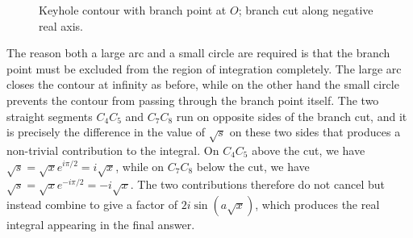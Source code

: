 \begin{figure}
\caption{Keyhole contour with branch point at $O$; branch cut along negative real axis.}
\label{fig:branch}
\end{figure}


The reason both a large arc and a small circle are required is that the branch point must be excluded from the region of integration completely. The large arc closes the contour at infinity as before, while on the other hand the small circle prevents the contour from passing through the branch point itself. The two straight segments $C_4C_5$ and $C_7C_8$ run on opposite sides of the branch cut, and it is precisely the difference in the value of $\sqrt{s}$ on these two sides that produces a non-trivial contribution to the integral. On $C_4C_5$ above the cut, we have $\sqrt{s} = \sqrt{x}e^{i\pi/2} = i\sqrt{x}$, while on $C_7C_8$ below the cut, we have $\sqrt{s} = \sqrt{x}e^{-i\pi/2} = -i\sqrt{x}$. The two contributions therefore do not cancel but instead combine to give a factor of $2i\sin(a\sqrt{x})$, which produces the real integral appearing in the final answer. \cite{RedBook,carrier2005}
\\
\\

